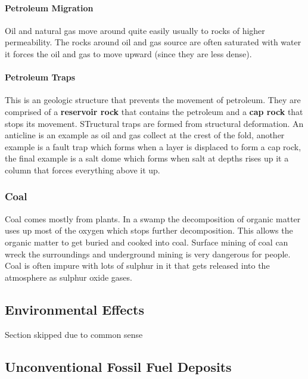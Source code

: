 \documentclass{article}
\begin{document}
\paragraph{Petroleum Migration} %
\label{par:petroleum_migration}
Oil and natural gas move around quite easily usually to rocks of higher permeability. The rocks around oil and gas source are often saturated with water it forces the oil and gas to move upward (since they are less dense).

\paragraph{Petroleum Traps} %
\label{par:petroleum_traps}
This is an geologic structure that prevents the movement of petroleum. They are comprised of a \textbf{reservoir rock} that contains the petroleum and a \textbf{cap rock} that stops its movement. STructural traps are formed from structural deformation. An anticline is an example as oil and gas collect at the crest of the fold, another example is a fault trap which forms when a layer is displaced to form a cap rock, the final example is a salt dome which forms when salt at depths rises up it a column that forces everything above it up.

\subsubsection{Coal} %
\label{sub:coal}
Coal comes mostly from plants. In a swamp the decomposition of organic matter uses up most of the oxygen which stops further decomposition. This allows the organic matter to get buried and cooked into coal. Surface mining of coal can wreck the surroundings and underground mining is very dangerous for people. Coal is often impure with lots of sulphur in it that gets released into the atmosphere as sulphur oxide gases.

\subsection{Environmental Effects} %
\label{sub:environmental_effects}
Section skipped due to common sense


\subsection{Unconventional Fossil Fuel Deposits} %
\label{sub:unconventional_fossil_fuel_deposits}
\end{document}
